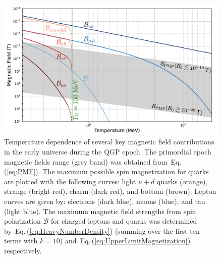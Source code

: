 \documentclass[epjST]{svjour}
\newcommand{\req}[1]{Eq.\,(\ref{#1})}
\begin{document}
\begin{figure}%
\centerline{
\includegraphics[width=0.90\columnwidth]{Figure_1_v3.pdf}}
\caption{\label{Figure_1}Temperature dependence of several key magnetic field contributions in the early universe during the QGP epoch. {\color{blue}The primordial epoch magnetic fields range (grey band) was obtained from~\req{eq:PMF}. The maximum possible spin magnetization for quarks are plotted with the following curves: light \(u+d\) quarks (orange), strange (bright red), charm (dark red), and bottom (brown). Lepton curves are given by: electrons (dark blue), muons (blue), and tau (light blue). The maximum magnetic field strengths from spin polarization \(\mathcal{B}\) for charged leptons and quarks was determined by~\req{eq:HeavyNumberDensity} (summing over the first ten terms with \(k=10\)) and~\req{eq:UpperLimitMagnetization} respectively.}}
\end{figure}
\end{document}
